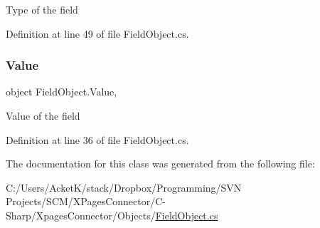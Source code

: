 Type of the field 



Definition at line 49 of file Field\+Object.\+cs.

\mbox{\label{class_field_object_a9764fb1824cec95b82cd6ac0b4cd8919}} 
\subsubsection{\texorpdfstring{Value}{Value}}
{\footnotesize\ttfamily object Field\+Object.\+Value\hspace{0.3cm}{\ttfamily [get]}, {\ttfamily [set]}}



Value of the field 



Definition at line 36 of file Field\+Object.\+cs.



The documentation for this class was generated from the following file\+:\begin{DoxyCompactItemize}
\item 
C\+:/\+Users/\+Acket\+K/stack/\+Dropbox/\+Programming/\+S\+V\+N Projects/\+S\+C\+M/\+X\+Pages\+Connector/\+C-\/\+Sharp/\+Xpages\+Connector/\+Objects/\hyperlink{_field_object_8cs}{Field\+Object.\+cs}\end{DoxyCompactItemize}
